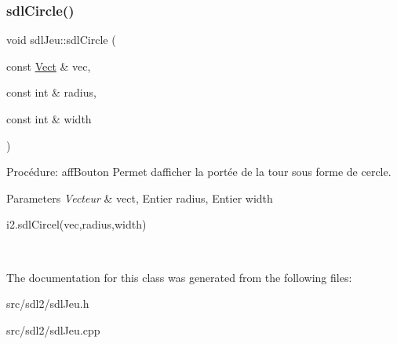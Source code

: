 \subsubsection{\texorpdfstring{sdl\+Circle()}{sdlCircle()}}
{\footnotesize\ttfamily void sdl\+Jeu\+::sdl\+Circle (\begin{DoxyParamCaption}\item[{const \hyperlink{classVect}{Vect} \&}]{vec,  }\item[{const int \&}]{radius,  }\item[{const int \&}]{width }\end{DoxyParamCaption})}



Procédure\+: aff\+Bouton Permet d\textquotesingle{}afficher la portée de la tour sous forme de cercle. 


\begin{DoxyParams}{Parameters}
{\em Vecteur} & vect, Entier radius, Entier width 
\begin{DoxyCode}
i2.sdlCircel(vec,radius,width)
\end{DoxyCode}
 \\
\hline
\end{DoxyParams}


The documentation for this class was generated from the following files\+:\begin{DoxyCompactItemize}
\item 
src/sdl2/sdl\+Jeu.\+h\item 
src/sdl2/sdl\+Jeu.\+cpp\end{DoxyCompactItemize}
